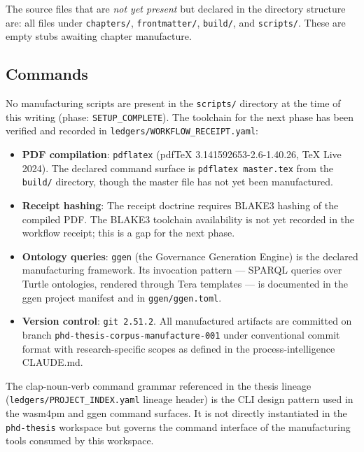 The source files that are \emph{not yet present} but declared in the directory structure are:
all files under \texttt{chapters/}, \texttt{frontmatter/}, \texttt{build/}, and
\texttt{scripts/}. These are empty stubs awaiting chapter manufacture.

\subsection{Commands}
\label{sec:phd-thesis-impl-commands}

No manufacturing scripts are present in the \texttt{scripts/} directory at the time of this
writing (phase: \texttt{SETUP\_COMPLETE}). The toolchain for the next phase has been verified
and recorded in \texttt{ledgers/WORKFLOW\_RECEIPT.yaml}:

\begin{itemize}
  \item \textbf{PDF compilation}: \texttt{pdflatex} (pdfTeX 3.141592653-2.6-1.40.26,
    TeX Live 2024). The declared command surface is \texttt{pdflatex master.tex} from the
    \texttt{build/} directory, though the master file has not yet been manufactured.
  \item \textbf{Receipt hashing}: The receipt doctrine requires BLAKE3 hashing of the
    compiled PDF. The BLAKE3 toolchain availability is not yet recorded in the workflow
    receipt; this is a gap for the next phase.
  \item \textbf{Ontology queries}: \texttt{ggen} (the Governance Generation Engine) is the
    declared manufacturing framework. Its invocation pattern --- SPARQL queries over Turtle
    ontologies, rendered through Tera templates --- is documented in the ggen project manifest
    and in \texttt{ggen/ggen.toml}.
  \item \textbf{Version control}: \texttt{git 2.51.2}. All manufactured artifacts are
    committed on branch \texttt{phd-thesis-corpus-manufacture-001} under conventional commit
    format with research-specific scopes as defined in the process-intelligence CLAUDE.md.
\end{itemize}

The clap-noun-verb command grammar referenced in the thesis lineage
(\texttt{ledgers/PROJECT\_INDEX.yaml} lineage header) is the CLI design pattern used in the
wasm4pm and ggen command surfaces. It is not directly instantiated in the \texttt{phd-thesis}
workspace but governs the command interface of the manufacturing tools consumed by this
workspace.

